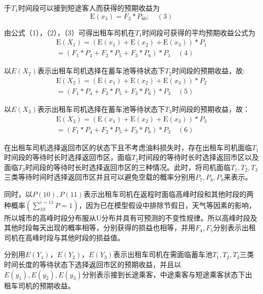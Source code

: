 \documentclass[withoutpreface,bwprint]{cumcmthesis} %
\begin{document}
于$T_1$时间段可以接到短途客人而获得的预期收益为
$$
\mathrm{E}\left(x_{3}\right)=F_{3} * P_{60}; \quad(3)
$$

由公式（1），（2），（3）可得出租车司机在$T_1$时间段可获得的平均预期收益公式为
$$
\begin{array}{l}{\mathrm{E}\left(X_{1}\right)=\left(\mathrm{E}\left(x_{1}\right)+\mathrm{E}\left(x_{2}\right)+\mathrm{E}\left(x_{3}\right)\right) * P_{1}} \\ {=\left(F_{1} * P_{4}+F_{2} * P_{5}+F_{3} * P_{6}\right) * P_{1}} \quad(4)\end{array}
$$

以$E(X_2)$表示出租车司机选择在蓄车池等待状态下$T_2$时间段的预期收益，故:
$$
\begin{array}{l}{\mathrm{E}\left(X_{2}\right)=\left(\mathrm{E}\left(x_{1}\right)+\mathrm{E}\left(x_{2}\right)+\mathrm{E}\left(x_{3}\right)\right) * P_{2}} \\ {=\left(F_{1} * P_{4}+F_{2} * P_{5}+F_{3} * P_{6}\right) * P_{3}} \quad(5)\end{array}
$$

以$E(X_3)$表示出租车司机选择在蓄车池等待状态下$T_3$时间段的预期收益，故：
$$
\begin{array}{l}{\mathrm{E}\left(X_{3}\right)=\left(\mathrm{E}\left(x_{1}\right)+\mathrm{E}\left(x_{2}\right)+\mathrm{E}\left(x_{3}\right)\right) * P_{3} } \\ {=\left(F_{1} * P_{4}+F_{2} * P_{5}+F_{3} * P_{6}\right) * P_{3}} \quad(6)\end{array}
$$

在出租车司机选择返回市区的状态下且不考虑油料损失时，存在出租车司机面临$T_1$时间段的等待时长时选择返回市区，面临$T_2$时间段的等待时长时选择返回市区以及面临$T_3$时间段的等待时长时选择返回市区的三种情况。此时，将司机面临$T_1,T_2,T_3$三类等待时间时选择返回市区并且可以避免空载的概率分别用$P_7,P_8,P_9$来表示。

同时，以$P(10),P(11)$表示出租车司机在返程时面临高峰时段和其他时段的两种概率$\left(\sum_{10}^{i=11} P=1\right)$，因为已在模型假设中排除节假日，天气等因素的影响，所以城市的高峰时段分布服从U分布并具有可预测的不变性规律。所以高峰时段及其他时段每天出现的概率相等，分别获得的损益也相等，并用$F_4,F_5$分别表示出租司机在高峰时段与其他时段的损益值。

分别用$E(Y_1)$，$E(Y_2)$，$E(Y_3)$表示出租车司机在需面临蓄车池$T_1,T_2,T_3$三类时间长度的等待状态下选择返回市区的预期收益，并且以$E(y_1), E(y_2), E(y_3)$分别表示接到长途乘客，中途乘客与短途乘客状态下出租车司机的预期收益。
\end{document}
